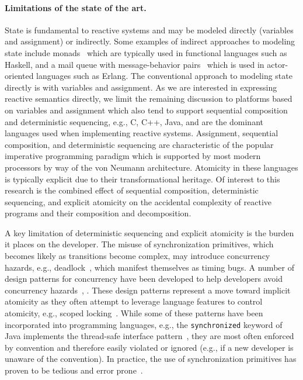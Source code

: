 \paragraph{Limitations of the state of the art.}
State is fundamental to reactive systems and may be modeled directly (variables and assignment) or indirectly.
Some examples of indirect approaches to modeling state include monads~\cite{wadler1990comprehending} which are typically used in functional languages such as Haskell, and a mail queue with message-behavior pairs~\cite{agha1985actors} which is used in actor-oriented languages such as Erlang.
The conventional approach to modeling state directly is with variables and assignment.
As we are interested in expressing reactive semantics directly, we limit the remaining discussion to platforms based on variables and assignment which also tend to support sequential composition and deterministic sequencing, e.g., C, C++, Java, and are the dominant languages used when implementing reactive systems.
Assignment, sequential composition, and deterministic sequencing are characteristic of the popular imperative programming paradigm which is supported by most modern processors by way of the von Neumann architecture.
Atomicity in these languages is typically explicit due to their transformational heritage.
Of interest to this research is the combined effect of sequential composition, deterministic sequencing, and explicit atomicity on the accidental complexity of reactive programs and their composition and decomposition.

A key limitation of deterministic sequencing and explicit atomicity is the burden it places on the developer.
The misuse of synchronization primitives, which becomes likely as transitions become complex, may introduce concurrency hazards, e.g., deadlock~\cite{dijkstra1965cooperating}, which manifest themselves as timing bugs.
A number of design patterns for concurrency have been developed to help developers avoid concurrency hazards~\cite{schmidt2000pattern}, \cite{lea2000concurrent}.
These design patterns represent a move toward implicit atomicity as they often attempt to leverage language features to control atomicity, e.g., scoped locking~\cite{schmidt2000pattern}.
While some of these patterns have been incorporated into programming languages, e.g., the \verb+synchronized+ keyword of Java implements the thread-safe interface pattern~\cite{schmidt2000pattern}, they are most often enforced by convention and therefore easily violated or ignored (e.g., if a new developer is unaware of the convention).
In practice, the use of synchronization primitives has proven to be tedious and error prone~\cite{sutter2005software}.

